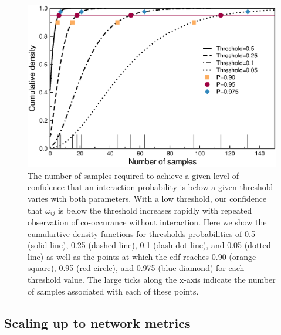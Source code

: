 \documentclass[12pt]{article}
\begin{document}
      \begin{figure}[ht]
        \caption{The number of samples required to achieve a given level of confidence that an interaction probability is below a given threshold varies with both parameters. With a low threshold, our confidence that $\omega_{ij}$ is below the threshold increases rapidly with repeated observation of co-occurance without interaction. Here we show the cumulartive density functions for thresholds probabilities of 0.5 (solid line), 0.25 (dashed line), 0.1 (dash-dot line), and 0.05 (dotted line) as well as the points at which the cdf reaches 0.90 (orange square), 0.95 (red circle), and 0.975 (blue diamond) for each threshold value. The large ticks along the x-axis indicate the number of samples associated with each of these points.}
        \label{Salix_cdfs}
        \includegraphics[width=.8\textwidth]{figures/Salix_Galler_samples_and_cdfs.eps}

        \end{figure}


  \subsection*{Scaling up to network metrics}




\clearpage

     
\end{document}
